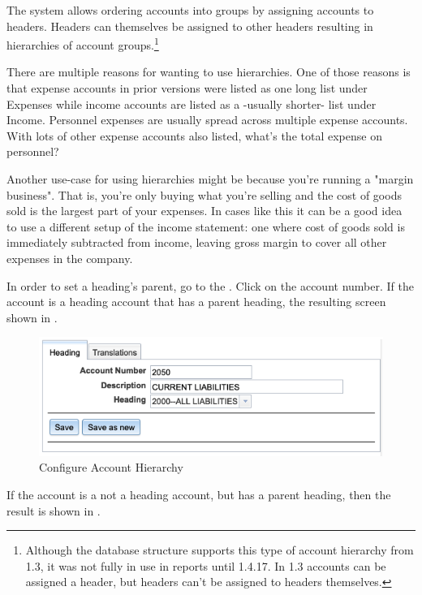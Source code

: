 The system allows ordering accounts into groups by assigning accounts to headers. Headers
can themselves be assigned to other headers resulting in hierarchies of account groups.\footnote{Although the
    database structure supports this type of account hierarchy from  1.3, it was not fully in use in reports until  1.4.17. In 1.3 accounts can be assigned a header,
    but headers can't be assigned to headers themselves.}

There are multiple reasons for wanting to use hierarchies. One of those reasons is that expense accounts in prior versions were listed as one long list under Expenses while income accounts are listed as a -usually shorter- list under Income. Personnel expenses are usually spread across multiple expense accounts. With lots of other expense accounts also listed, what's the total expense on personnel?

Another use-case for using hierarchies might be because you're running a "margin business". That is, you're only buying what you're selling and the cost of goods sold is the largest part of your expenses. In cases like this it can be a good idea to use a different setup of the income statement: one where cost of goods sold is immediately subtracted from income, leaving gross margin to cover all other expenses in the company.


In order to set a heading's parent, go to the . Click on the account number. If the account is a heading account that has a parent heading, the resulting screen shown in .

\begin{figure}[H]
    \centering
    \includegraphics[width=\graphicswidth]{images/gl-coa-heading.png}
    \caption{Configure Account Hierarchy}
    \label{fig:config-coa-hierarchy}
\end{figure}

If the account is a not a heading account, but has a parent heading, then the result is shown in .

